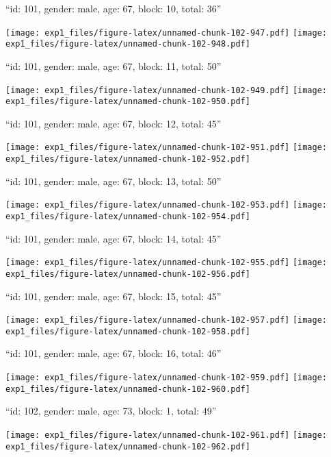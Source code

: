 \documentclass[11pt,,]{article}
\begin{document}
\newpage
[1] 

``id: 101, gender: male, age: 67, block: 10, total: 36''

\texttt{[image: exp1\_files/figure-latex/unnamed-chunk-102-947.pdf]}
\texttt{[image: exp1\_files/figure-latex/unnamed-chunk-102-948.pdf]}

\newpage
[1] 

``id: 101, gender: male, age: 67, block: 11, total: 50''

\texttt{[image: exp1\_files/figure-latex/unnamed-chunk-102-949.pdf]}
\texttt{[image: exp1\_files/figure-latex/unnamed-chunk-102-950.pdf]}

\newpage
[1] 

``id: 101, gender: male, age: 67, block: 12, total: 45''

\texttt{[image: exp1\_files/figure-latex/unnamed-chunk-102-951.pdf]}
\texttt{[image: exp1\_files/figure-latex/unnamed-chunk-102-952.pdf]}

\newpage
[1] 

``id: 101, gender: male, age: 67, block: 13, total: 50''

\texttt{[image: exp1\_files/figure-latex/unnamed-chunk-102-953.pdf]}
\texttt{[image: exp1\_files/figure-latex/unnamed-chunk-102-954.pdf]}

\newpage
[1] 

``id: 101, gender: male, age: 67, block: 14, total: 45''

\texttt{[image: exp1\_files/figure-latex/unnamed-chunk-102-955.pdf]}
\texttt{[image: exp1\_files/figure-latex/unnamed-chunk-102-956.pdf]}

\newpage
[1] 

``id: 101, gender: male, age: 67, block: 15, total: 45''

\texttt{[image: exp1\_files/figure-latex/unnamed-chunk-102-957.pdf]}
\texttt{[image: exp1\_files/figure-latex/unnamed-chunk-102-958.pdf]}

\newpage
[1] 

``id: 101, gender: male, age: 67, block: 16, total: 46''

\texttt{[image: exp1\_files/figure-latex/unnamed-chunk-102-959.pdf]}
\texttt{[image: exp1\_files/figure-latex/unnamed-chunk-102-960.pdf]}

\newpage
[1] 

``id: 102, gender: male, age: 73, block: 1, total: 49''

\texttt{[image: exp1\_files/figure-latex/unnamed-chunk-102-961.pdf]}
\texttt{[image: exp1\_files/figure-latex/unnamed-chunk-102-962.pdf]}
\end{document}
